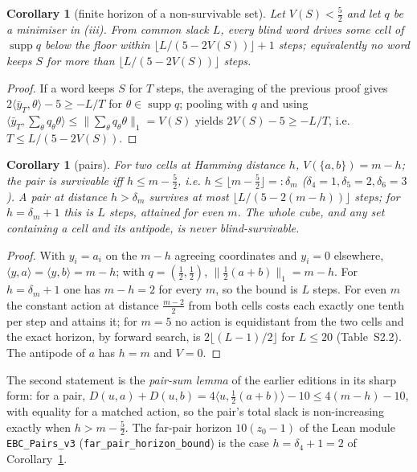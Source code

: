 \documentclass[11pt,a4paper]{article}
\theoremstyle{plain}
\newtheorem{corollary}[theorem]{Corollary}
\theoremstyle{definition}
\theoremstyle{remark}
\newcommand{\supp}{\operatorname{supp}}
\newcommand{\tfr}[2]{\tfrac{#1}{#2}}
\begin{document}
\begin{corollary}[finite horizon of a non-survivable set]\label{cor:horizon}
Let $V(S)<\tfr52$ and let $q$ be a minimiser in (iii). From common slack $L$, every blind word drives some cell of $\supp q$ below the floor within $\lfloor L/(5-2V(S))\rfloor+1$ steps; equivalently no word keeps $S$ for more than $\lfloor L/(5-2V(S))\rfloor$ steps.
\end{corollary}
\begin{proof}
If a word keeps $S$ for $T$ steps, the averaging of the previous proof gives $2\langle\bar y_T,\theta\rangle-5\ge-L/T$ for $\theta\in\supp q$; pooling with $q$ and using $\langle\bar y_T,\sum_\theta q_\theta\theta\rangle\le\|\sum_\theta q_\theta\theta\|_1=V(S)$ yields $2V(S)-5\ge-L/T$, i.e. $T\le L/(5-2V(S))$.
\end{proof}

\begin{corollary}[pairs]\label{cor:pairs}
For two cells at Hamming distance $h$, $V(\{a,b\})=m-h$; the pair is survivable iff $h\le m-\tfr52$, i.e. $h\le\lfloor m-\tfr52\rfloor=:\delta_m$ ($\delta_4=1,\delta_5=2,\delta_6=3$). A pair at distance $h>\delta_m$ survives at most $\lfloor L/(5-2(m-h))\rfloor$ steps; for $h=\delta_m+1$ this is $L$ steps, attained for even $m$. The whole cube, and any set containing a cell and its antipode, is never blind-survivable.
\end{corollary}
\begin{proof}
With $y_i=a_i$ on the $m-h$ agreeing coordinates and $y_i=0$ elsewhere, $\langle y,a\rangle=\langle y,b\rangle=m-h$; with $q=(\tfr12,\tfr12)$, $\|\tfr12(a+b)\|_1=m-h$. For $h=\delta_m+1$ one has $m-h=2$ for every $m$, so the bound is $L$ steps. For even $m$ the constant action at distance $\tfr{m-2}2$ from both cells costs each exactly one tenth per step and attains it; for $m=5$ no action is equidistant from the two cells and the exact horizon, by forward search, is $2\lfloor(L-1)/2\rfloor$ for $L\le20$ (Table~S2.2). The antipode of $a$ has $h=m$ and $V=0$.
\end{proof}

The second statement is the \emph{pair-sum lemma} of the earlier editions in its sharp form: for a pair, $D(u,a)+D(u,b)=4\langle u,\tfr12(a+b)\rangle-10\le4(m-h)-10$, with equality for a matched action, so the pair's total slack is non-increasing exactly when $h>m-\tfr52$. The far-pair horizon $10(z_0-1)$ of the Lean module \texttt{EBC\_Pairs\_v3} (\texttt{far\_pair\_horizon\_bound}) is the case $h=\delta_4+1=2$ of Corollary~\ref{cor:horizon}.
\end{document}
